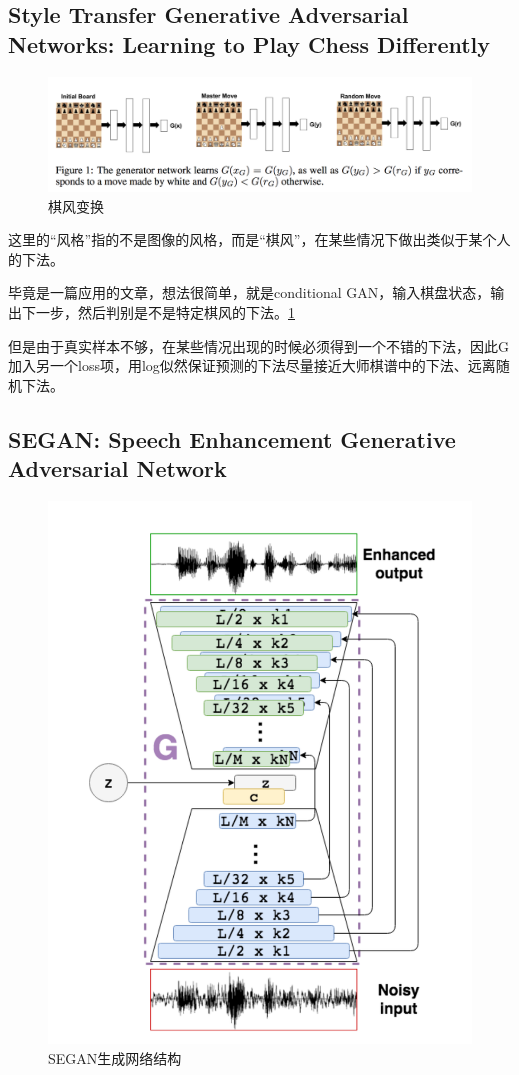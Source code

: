 \documentclass[a4paper]{article}
\begin{document}
\subsection{Style Transfer Generative Adversarial Networks: Learning to Play Chess Differently\cite{DBLP:journals/corr/ChidambaramQ17}}
\begin{figure}
\centering
\includegraphics[width=\textwidth]{./img/40.png}
\caption{棋风变换}
\label{fig:40}
\end{figure}
这里的“风格”指的不是图像的风格，而是“棋风”，在某些情况下做出类似于某个人的下法。

毕竟是一篇应用的文章，想法很简单，就是conditional GAN，输入棋盘状态，输出下一步，然后判别是不是特定棋风的下法。\ref{fig:40}

但是由于真实样本不够，在某些情况出现的时候必须得到一个不错的下法，因此G加入另一个loss项，用log似然保证预测的下法尽量接近大师棋谱中的下法、远离随机下法。
\subsection{SEGAN: Speech Enhancement Generative Adversarial Network\cite{DBLP:journals/corr/PascualBS17}}
\begin{figure}
\centering
\includegraphics[width=\textwidth]{./img/43.png}
\caption{SEGAN生成网络结构}
\label{fig:43}
\end{figure}
\end{document}
